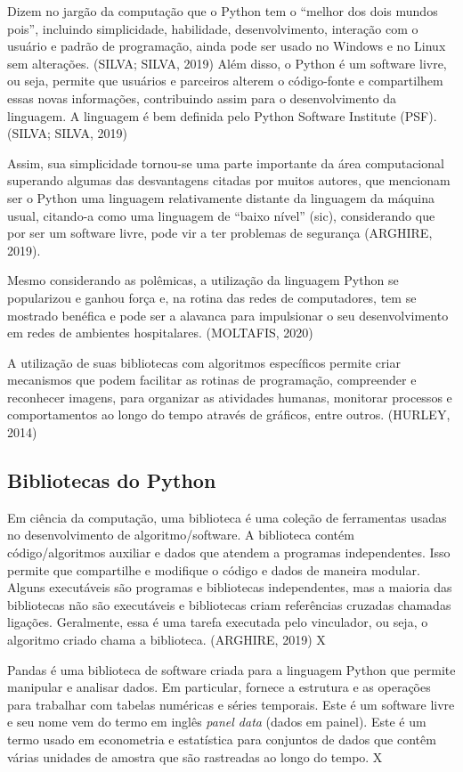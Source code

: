 \documentclass[
	12pt,				%
	openright,			%
	twoside,			%
	a4paper,			%
	english,			%
	french,				%
	spanish,			%
	brazil				%
	]{abntex2}
\begin{document}
Dizem no jargão da computação que o Python tem o “melhor dos dois mundos pois”, incluindo simplicidade, habilidade, desenvolvimento, interação com o usuário e padrão de programação, ainda pode ser usado no Windows e no Linux sem alterações. (SILVA; SILVA, 2019)
Além disso, o Python é um software livre, ou seja, permite que usuários e parceiros alterem o código-fonte e compartilhem essas novas informações, contribuindo assim para o desenvolvimento da linguagem. A linguagem é bem definida pelo Python Software Institute (PSF). (SILVA; SILVA, 2019) 

Assim, sua simplicidade tornou-se uma parte importante da área computacional superando algumas das desvantagens citadas por muitos autores, que mencionam ser o Python uma linguagem relativamente distante da linguagem da máquina usual, citando-a como uma linguagem de “baixo nível” (sic), considerando que por ser um software livre, pode vir a ter problemas de segurança (ARGHIRE, 2019).

Mesmo considerando as polêmicas, a utilização da linguagem Python se popularizou e ganhou força e, na rotina das redes de computadores, tem se mostrado benéfica e pode ser a alavanca para impulsionar o seu desenvolvimento em redes de ambientes hospitalares. (MOLTAFIS, 2020)

A utilização de suas bibliotecas com algoritmos específicos permite criar mecanismos que podem facilitar as rotinas de programação, compreender e reconhecer imagens, para organizar as atividades humanas, monitorar processos e comportamentos ao longo do tempo através de gráficos, entre outros. (HURLEY, 2014)

\subsection{Bibliotecas do Python}

Em ciência da computação, uma biblioteca é uma coleção de ferramentas usadas ​​no desenvolvimento de algoritmo/software. A biblioteca contém código/algoritmos auxiliar e dados que atendem a programas independentes. Isso permite que compartilhe e modifique o código e dados de maneira modular. Alguns executáveis são programas e bibliotecas independentes, mas a maioria das bibliotecas não são executáveis ​​e bibliotecas criam referências cruzadas chamadas ligações. Geralmente, essa é uma tarefa executada pelo vinculador, ou seja, o algoritmo criado chama a biblioteca. (ARGHIRE, 2019) X

Pandas é uma biblioteca de software criada para a linguagem Python que permite manipular e analisar dados. Em particular, fornece a estrutura e as operações para trabalhar com tabelas numéricas e séries temporais. Este é um software livre e seu nome vem do termo em inglês \textit{panel data} (dados em painel). Este é um termo usado em econometria e estatística para conjuntos de dados que contêm várias unidades de amostra que são rastreadas ao longo do tempo. X
\end{document}
